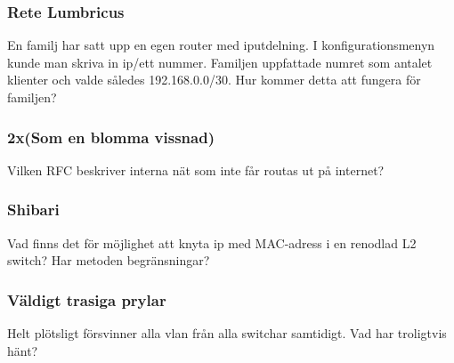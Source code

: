 \documentclass[a4paper]{report}
\begin{document}
\subsubsection{Rete Lumbricus}
En familj har satt upp en egen router med iputdelning. I konfigurationsmenyn kunde man skriva in ip/ett nummer. Familjen uppfattade numret som antalet klienter och valde således 192.168.0.0/30. Hur kommer detta att fungera för familjen?

\subsubsection{2x(Som en blomma vissnad)}
Vilken RFC beskriver interna nät som inte får routas ut på internet?

\subsubsection{Shibari}
Vad finns det för möjlighet att knyta ip med MAC-adress i en renodlad L2 switch? Har metoden begränsningar?

\subsubsection{Väldigt trasiga prylar}
Helt plötsligt försvinner alla vlan från alla switchar samtidigt. Vad har troligtvis hänt?
\end{document}
